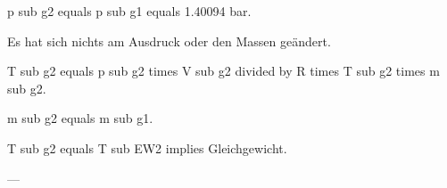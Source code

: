 p sub g2 equals p sub g1 equals 1.40094 bar.  

Es hat sich nichts am Ausdruck oder den Massen geändert.  

T sub g2 equals p sub g2 times V sub g2 divided by R times T sub g2 times m sub g2.  

m sub g2 equals m sub g1.  

T sub g2 equals T sub EW2 implies Gleichgewicht.  

---